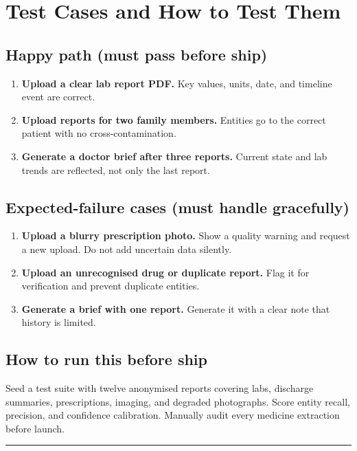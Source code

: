 \documentclass[11pt, a4paper]{article}
\begin{document}
\section{Test Cases and How to Test Them}

\subsection{Happy path (must pass before ship)}

\begin{enumerate}
  \item \textbf{Upload a clear lab report PDF.} Key values, units, date, and timeline event are correct.
  \item \textbf{Upload reports for two family members.} Entities go to the correct patient with no cross-contamination.
  \item \textbf{Generate a doctor brief after three reports.} Current state and lab trends are reflected, not only the last report.
\end{enumerate}

\subsection{Expected-failure cases (must handle gracefully)}

\begin{enumerate}
  \item \textbf{Upload a blurry prescription photo.} Show a quality warning and request a new upload. Do not add uncertain data silently.
  \item \textbf{Upload an unrecognised drug or duplicate report.} Flag it for verification and prevent duplicate entities.
  \item \textbf{Generate a brief with one report.} Generate it with a clear note that history is limited.
\end{enumerate}

\subsection{How to run this before ship}

Seed a test suite with twelve anonymised reports covering labs, discharge summaries, prescriptions, imaging, and degraded photographs. Score entity recall, precision, and confidence calibration. Manually audit every medicine extraction before launch.

\vspace{10pt}
\rule{\linewidth}{0.6pt}
\end{document}
